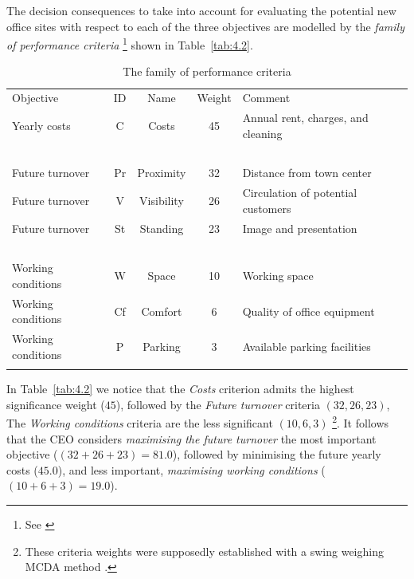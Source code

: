 The decision consequences to take into account for evaluating the potential new office sites with respect to each of the three objectives are modelled by the \emph{family of performance criteria} \footnote{See \citealp{ROY-2000}} shown in Table~\vref{tab:4.2}.
\begin{table}[ht]
\caption{The family of performance criteria}
\label{tab:4.2}       %
\begin{center}
    \begin{tabular}{l|c|c|c|l}
      \svhline\noalign{\smallskip}
      Objective & ID & Name & Weight & Comment\\
      \noalign{\smallskip}\hline\noalign{\smallskip}
    Yearly costs  &       C &   Costs &  45 &     Annual rent, charges, and cleaning\\
    \             &  \      & \        &  \ & \ \\
    Future turnover   &   Pr  & Proximity  & 32 & Distance from town center\\
    Future turnover   &   V  &  Visibility & 26 & Circulation of potential customers \\
    Future turnover   &   St &   Standing & 23 &   Image and presentation\\
    \                 &   \   & \          &  \ & \  \\
    Working conditions &  W  &  Space   &   10 &  Working space\\
    Working conditions &  Cf &  Comfort  &  6 &  Quality of office equipment\\
    Working conditions &  P  &  Parking  &  3 &  Available parking facilities\\
      \noalign{\smallskip}\hline
    \end{tabular}   
  \end{center}
\end{table}

In Table~\vref{tab:4.2} we notice that the \emph{Costs} criterion admits the highest significance weight ($45$), followed by the \emph{Future turnover} criteria $(32, 26, 23)$, The \emph{Working conditions} criteria are the less significant $(10, 6, 3)$ \footnote{These criteria weights were supposedly established with a swing weighing MCDA method \citep{KEE-1976}.}. It follows that the CEO considers \emph{maximising the future turnover} the most important objective ($(32 + 26+ 23) = 81.0$), followed by minimising the future yearly costs ($45.0$), and less important, \emph{maximising working conditions} ($(10 + 6 + 3) = 19.0$). 

